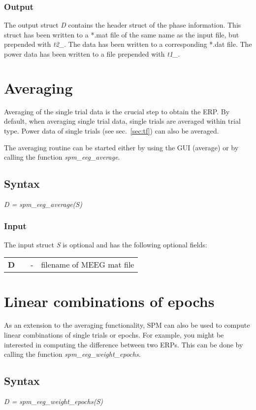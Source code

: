 \subsubsection{Output}
The output struct {\it D} contains the header struct of the phase
information. This struct has been written to a *.mat file of the same
name as the input file, but prepended with {\it t2\_}. The data has
been written to a corresponding *.dat file. The power data has been
written to a file prepended with {\it t1\_}.

\section{Averaging}
Averaging of the single trial data is the crucial step to obtain the
ERP. By default, when averaging single trial data, single trials are
averaged within trial type. Power data of single trials (see
sec.~\ref{sec:tf}) can also be averaged.

The averaging routine can be started either by using the GUI (average)
or by calling the function \textit{spm\_eeg\_average}.

\subsection{Syntax}
\textit{D = spm\_eeg\_average(S)}
\\

\subsubsection{Input}
The input struct {\it S} is optional and has the following optional fields:

\begin{tabular}{llcp{9cm}}
{\bf D} & & - & filename of MEEG mat file\\
\end{tabular}

\section{Linear combinations of epochs}
As an extension to the averaging functionality, SPM can also be used
to compute linear combinations of single trials 
or epochs. For example, you might be interested in computing the
difference between two ERPs. This can be done by calling the function
\textit{spm\_eeg\_weight\_epochs}. 

\subsection{Syntax}
\textit{D = spm\_eeg\_weight\_epochs(S)}
\\

